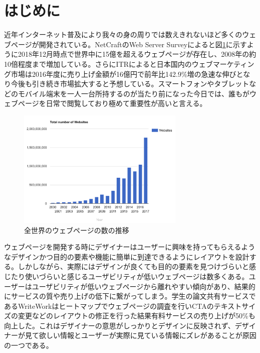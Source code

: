 
\renewcommand{\baselinestretch}{1.5} %
\section{はじめに}\label{sec:introduction}
\renewcommand{\baselinestretch}{1} %

\par 近年インターネット普及により我々の身の周りでは数えきれないほど多くのウェブページが開発されている。NetCraftのWeb Server Surveyによると図\ref{fig-num_websites}に示すように2018年12月時点で世界中に15億を超えるウェブページが存在し、2008年の約10倍程度まで増加している\cite{webserver_survey}。さらにITRによると日本国内のウェブマーケティング市場は2016年度に売り上げ金額が16億円で前年比142.9\%増の急速な伸びとなり今後も引き続き市場拡大すると予想している\cite{itr_webmarket}。スマートフォンやタブレットなどのモバイル端末を一人一台所持するのが当たり前になった今日では、誰もがウェブページを日常で閲覧しており極めて重要性が高いと言える。

\begin{figure}[H]
    \centering
    \includegraphics[width=8cm]{figures/01_number-of-websites.png}
    \caption{全世界のウェブページの数の推移\cite{internetlivestats}}
    \label{fig-num_websites}
\end{figure}

\par ウェブページを開発する時にデザイナーはユーザーに興味を持ってもらえるようなデザインかつ目的の要素や機能に簡単に到達できるようにレイアウトを設計する。しかしながら、実際にはデザインが良くても目的の要素を見つけづらいと感じたり使いづらいと感じるユーザビリティが低いウェブページは数多くある。ユーザーはユーザビリティが低いウェブページから離れやすい傾向があり、結果的にサービスの質や売り上げの低下に繋がってしまう。学生の論文共有サービスであるWriteWork\cite{writework}はヒートマップでウェブページの調査を行いCTAのテキストサイズの変更などのレイアウトの修正を行った結果有料サービスの売り上げが50\%も向上した\cite{writeworkabtest}。これはデザイナーの意思がしっかりとデザインに反映されず、デザイナーが見て欲しい情報とユーザーが実際に見ている情報にズレがあることが原因の一つである。

